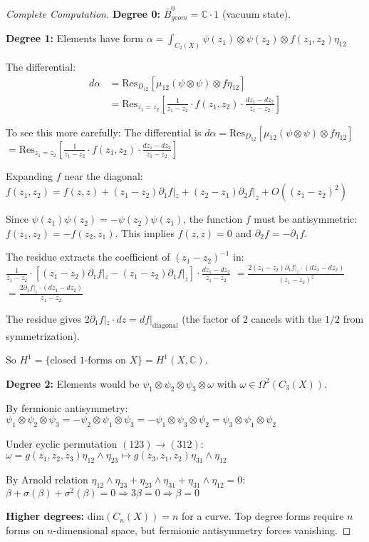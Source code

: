 \begin{proof}[Complete Computation]
\textbf{Degree 0:} $\bar{B}^0_{geom} = \mathbb{C} \cdot 1$ (vacuum state).

\textbf{Degree 1:} Elements have form
$\alpha = \int_{C_2(X)} \psi(z_1) \otimes \psi(z_2) \otimes f(z_1,z_2)\eta_{12}$

The differential:
\begin{align}
d\alpha &= \text{Res}_{D_{12}}[\mu_{12}(\psi \otimes \psi) \otimes f\eta_{12}]\\
&= \text{Res}_{z_1=z_2}\left[\frac{1}{z_1-z_2} \cdot f(z_1,z_2) \cdot \frac{dz_1-dz_2}{z_1-z_2}\right]
\end{align}

To see this more carefully: The differential is
$d\alpha = \text{Res}_{D_{12}}[\mu_{12}(\psi \otimes \psi) \otimes f\eta_{12}]$
$= \text{Res}_{z_1=z_2}\left[\frac{1}{z_1 - z_2} \cdot f(z_1, z_2) \cdot \frac{dz_1 - dz_2}{z_1 - z_2}\right]$

Expanding $f$ near the diagonal:
$f(z_1, z_2) = f(z, z) + (z_1 - z_2)\partial_1 f|_z + (z_2 - z_1)\partial_2 f|_z + O((z_1 - z_2)^2)$

Since $\psi(z_1)\psi(z_2) = -\psi(z_2)\psi(z_1)$, the function $f$ must be antisymmetric: $f(z_1, z_2) = -f(z_2, z_1)$. This implies $f(z, z) = 0$ and $\partial_2 f = -\partial_1 f$. 

The residue extracts the coefficient of $(z_1 - z_2)^{-1}$ in:
$\frac{1}{z_1 - z_2} \cdot [(z_1 - z_2)\partial_1 f|_z - (z_1 - z_2)\partial_1 f|_z] \cdot \frac{dz_1 - dz_2}{z_1 - z_2}$
$= \frac{2(z_1 - z_2)\partial_1 f|_z \cdot (dz_1 - dz_2)}{(z_1 - z_2)^2}$
$= \frac{2\partial_1 f|_z \cdot (dz_1 - dz_2)}{z_1 - z_2}$

The residue gives $2\partial_1 f|_z \cdot dz = df|_{\text{diagonal}}$ (the factor of 2 cancels with the $1/2$ from symmetrization).

So $H^1 = \{\text{closed 1-forms on } X\} = H^1(X, \mathbb{C})$.

\textbf{Degree 2:} Elements would be $\psi_1 \otimes \psi_2 \otimes \psi_3 \otimes \omega$ with $\omega \in \Omega^2(C_3(X))$.

By fermionic antisymmetry:
$\psi_1 \otimes \psi_2 \otimes \psi_3 = -\psi_2 \otimes \psi_1 \otimes \psi_3 = -\psi_1 \otimes \psi_3 \otimes \psi_2 = \psi_3 \otimes \psi_1 \otimes \psi_2$

Under cyclic permutation $(123) \to (312)$:
$\omega = g(z_1,z_2,z_3)\eta_{12} \wedge \eta_{23} \mapsto g(z_3,z_1,z_2)\eta_{31} \wedge \eta_{12}$

By Arnold relation $\eta_{12} \wedge \eta_{23} + \eta_{23} \wedge \eta_{31} + \eta_{31} \wedge \eta_{12} = 0$:
$\beta + \sigma(\beta) + \sigma^2(\beta) = 0 \Rightarrow 3\beta = 0 \Rightarrow \beta = 0$

\textbf{Higher degrees:} $\text{dim}(C_n(X)) = n$ for a curve. Top degree forms require $n$ forms on $n$-dimensional space, but fermionic antisymmetry forces vanishing.
\end{proof}

